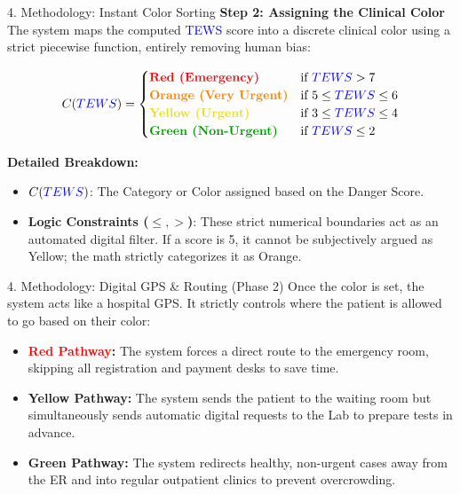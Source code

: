 \documentclass[11pt, aspectratio=169]{beamer}
\begin{document}
	\begin{frame}{4. Methodology: Instant Color Sorting}
		\textbf{Step 2: Assigning the Clinical Color} \\
		The system maps the computed \textcolor{blue}{TEWS} score into a discrete clinical color using a strict piecewise function, entirely removing human bias:
		\vspace{0.1cm}
		
		\[
		C(\textcolor{blue}{TEWS}) = \begin{cases}
			\text{\textbf{\textcolor{red}{Red (Emergency)}}} & \text{if } \textcolor{blue}{TEWS} > 7 \\
			\text{\textbf{\textcolor{orange}{Orange (Very Urgent)}}} & \text{if } 5 \le \textcolor{blue}{TEWS} \le 6 \\
			\text{\textbf{\textcolor{yellow!90!black}{Yellow (Urgent)}}} & \text{if } 3 \le \textcolor{blue}{TEWS} \le 4 \\
			\text{\textbf{\textcolor{green!60!black}{Green (Non-Urgent)}}} & \text{if } \textcolor{blue}{TEWS} \le 2
		\end{cases}
		\]
		
		\vspace{0.1cm}
		\textbf{Detailed Breakdown:}
		\begin{itemize}
			\item \textbf{$C(\textcolor{blue}{TEWS})$}: The Category or Color assigned based on the Danger Score.
			\item \textbf{Logic Constraints ($\le, >$)}: These strict numerical boundaries act as an automated digital filter. If a score is 5, it cannot be subjectively argued as Yellow; the math strictly categorizes it as Orange.
		\end{itemize}
	\end{frame}
	
	\begin{frame}{4. Methodology: Digital GPS \& Routing (Phase 2)}
		Once the color is set, the system acts like a hospital GPS. It strictly controls where the patient is allowed to go based on their color:
		\vspace{0.3cm}
		\begin{itemize}
			\item \textbf{\textcolor{red}{Red Pathway}:} The system forces a direct route to the emergency room, skipping all registration and payment desks to save time.
			\item \textbf{\textcolor{yellow!90!black}{Yellow Pathway}:} The system sends the patient to the waiting room but simultaneously sends automatic digital requests to the Lab to prepare tests in advance.
			\item \textbf{\textcolor{green!60!black}{Green Pathway}:} The system redirects healthy, non-urgent cases away from the ER and into regular outpatient clinics to prevent overcrowding.
		\end{itemize}
	\end{frame}
	
\end{document}
